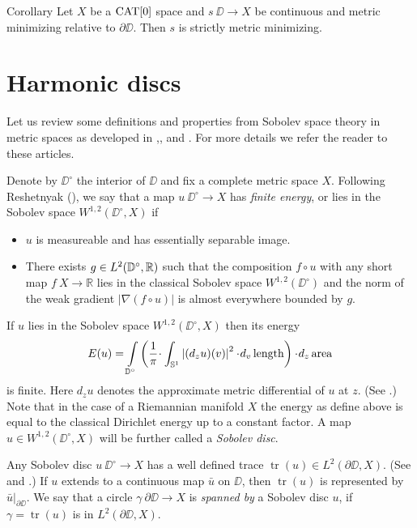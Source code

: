 \documentclass{article}
\begin{document}
\begin{thm}{Corollary}\label{cor:strict-mm}
Let  $X$ be a $\mathop{\rm CAT}\nolimits[0]$ space and $s\:\DD\to X$ be continuous and metric minimizing relative to $\partial\DD$. 
Then $s$ is strictly metric minimizing.
\end{thm}

\section{Harmonic discs}\label{Harmonic discs}

Let us review some definitions and properties from Sobolev space theory in metric spaces as developed in 
\cite{KS},\cite{R}, \cite{HKST} and \cite{LW}. 
For more details we refer the reader to these articles.

Denote by  $\DD^\circ$ the interior of $\DD$ and fix a complete metric space $X$.
Following Reshetnyak (\cite{R}), we say that a map $u\:\DD^\circ\to X$ has {\em finite energy}, or lies in the Sobolev space $W^{1,2}(\DD^\circ,X)$ if
\begin{itemize}
 \item $u$ is measureable and has essentially separable image. %
 \item There exists $g\in L^2(\mathbb{D}^\circ,\mathbb{R})$ such that the composition $f\circ u$ with any short map $f\:X\to \mathbb{R}$ 
lies in the classical Sobolev space $W^{1,2}(\DD^\circ)$
 and the norm of the weak gradient $|\nabla(f\circ u)|$ is almost everywhere bounded by $g$.
\end{itemize}

If $u$ lies in the Sobolev space $W^{1,2}(\DD^\circ,X)$ then its energy 
\[E(u)=
\int\limits_{\DD^\circ}\left(\frac{1}{\pi}\cdot\int_{\mathbb{S}^1}\left|(d_zu)(v)\right|^2\cdot d_v\length\right)\cdot d_z\area\]
is finite. 
Here $d_zu$ denotes the approximate metric differential of $u$ at $z$.
(See \cite{LW}.)
Note that in the case of a Riemannian manifold $X$ the energy as define above is equal to
the classical Dirichlet energy up to a constant factor.
A map $u\in W^{1,2}(\DD^\circ,X)$ will be further called a \emph{Sobolev disc}.

Any Sobolev disc $u\:\DD^\circ\to X$ has a well defined trace $\operatorname{tr}(u)\in L^2(\partial\DD,X)$. 
(See \cite{KS} and \cite{LW}.)
If $u$ extends to a continuous map $\bar u$ on $\DD$, then $\operatorname{tr}(u)$ is represented by $\bar u|_{\partial\DD}$. 
We say that a circle $\gamma\:\partial\DD\to X$ is {\em spanned by} a Sobolev disc $u$, if $\gamma=\operatorname{tr}(u)$ is in 
$L^2(\partial\DD,X)$.
\end{document}
